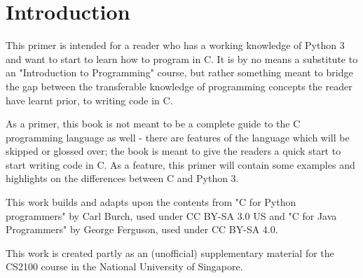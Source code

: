 \chapter{Introduction}
This primer is intended for a reader who has a working knowledge of Python 3 and want to start to learn how to program in C. It is by no means a substitute to an "Introduction to Programming" course, but rather something meant to bridge the gap between the transferable knowledge of programming concepts the reader have learnt prior, to writing code in C. 

As a primer, this book is not meant to be a complete guide to the C programming language as well - there are features of the language which will be skipped or glossed over; the book is meant to give the readers a quick start to start writing code in C. As a feature, this primer will contain some examples and highlights on the differences between C and Python 3.

This work builds and adapts upon the contents from "C for Python programmers" by Carl Burch, used under CC BY-SA 3.0 US and "C for Java Programmers" by George Ferguson, used under CC BY-SA 4.0.

This work is created partly as an (unofficial) supplementary material for the CS2100 course in the National University of Singapore.


